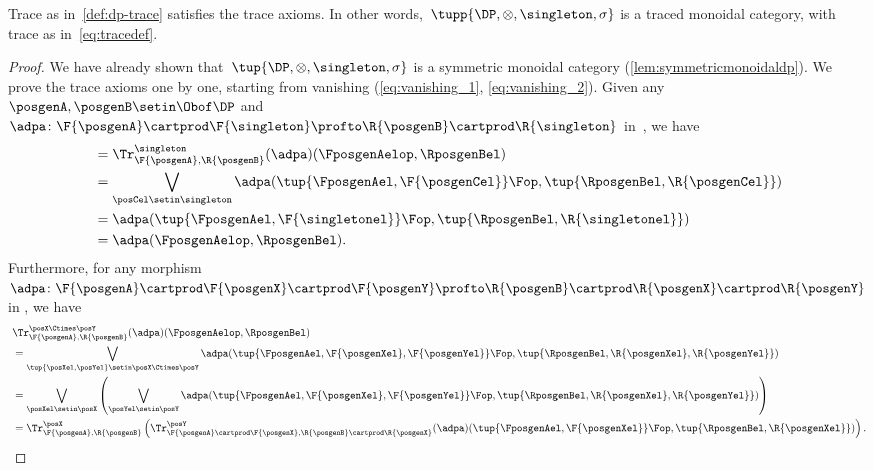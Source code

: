 {    \begin{lemma}
        Trace as in~\cref{def:dp-trace} satisfies the trace axioms.
        In other words,~$\tupp{\DP, \otimes, \singleton, \sigma}$ is a traced monoidal category, with trace as in~\cref{eq:tracedef}.
    \end{lemma}
    \begin{proof}
        We have already shown that~$\tup{\DP,\otimes,\singleton,\sigma}$ is a symmetric monoidal category (\cref{lem:symmetricmonoidaldp}).
        We prove the trace axioms one by one, starting from vanishing (\cref{eq:vanishing_1}, \cref{eq:vanishing_2}).
        Given any~$\posgenA,\posgenB\setin \Obof\DP$ and~$\adpa\colon \F{\posgenA}\cartprod \F{\singleton}\profto \R{\posgenB}\cartprod \R{\singleton}$ in~\DP, we have
        \begin{equation}
            \begin{aligned}
                 & = \Tr_{\F{\posgenA},\R{\posgenB}}^{\singleton}(\adpa)(\FposgenAelop,\RposgenBel) \\
                 & =\bigvee_{\posCel\setin \singleton}\adpa(\tup{\FposgenAel,\F{\posgenCel}}\Fop,\tup{\RposgenBel,\R{\posgenCel}}) \\
                 & =\adpa(\tup{\FposgenAel,\F{\singletonel}}\Fop,\tup{\RposgenBel,\R{\singletonel}}) \\
                 & =\adpa(\FposgenAelop,\RposgenBel).
            \end{aligned}
        \end{equation}
        Furthermore, for any morphism~$\adpa\colon \F{\posgenA}\cartprod \F{\posgenX}\cartprod \F{\posgenY} \profto \R{\posgenB}\cartprod \R{\posgenX} \cartprod \R{\posgenY}$ in \DP, we have
        \begin{equation}
            \begin{aligned}
                ~ & \Tr_{\F{\posgenA},\R{\posgenB}}^{\posX\Ctimes\posY}(\adpa)(\FposgenAelop,\RposgenBel) \\
                  & = \bigvee_{\tup{\posXel,\posYel} \setin \posX\Ctimes \posY} \adpa(\tup{\FposgenAel,\F{\posgenXel},\F{\posgenYel}}\Fop,\tup{\RposgenBel,\R{\posgenXel},\R{\posgenYel}}) \\
                  & =\bigvee_{\posXel \setin \posX}\left(\bigvee_{\posYel \setin \posY} \adpa(\tup{\FposgenAel,\F{\posgenXel},\F{\posgenYel}}\Fop,\tup{\RposgenBel,\R{\posgenXel},\R{\posgenYel}})\right) \\
                  & =\Tr_{\F{\posgenA},\R{\posgenB}}^\posX\left(
                \Tr_{\F{\posgenA}\cartprod \F{\posgenX},\R{\posgenB}\cartprod \R{\posgenX}}^\posY(\adpa)(\tup{\FposgenAel,\F{\posgenXel}}\Fop,\tup{\RposgenBel,\R{\posgenXel}})\right).

\end{aligned}
\end{equation}
\end{proof}}
